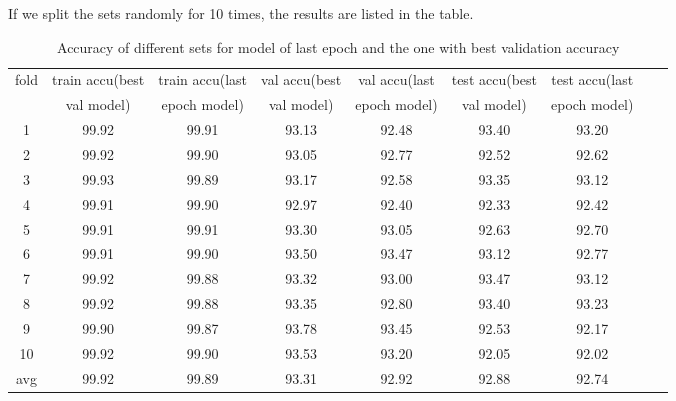If we split the sets randomly for 10 times, the results are listed in the table.
\begin{table}[!htbp]
	\centering
	\caption{Accuracy of different sets for model of last epoch and the one with best validation accuracy }
	\label{table:cv1}
	\begin{tabular}{|c|c|c|c|c|c|c|c|c|}
		\hline
%		
fold	&	train accu(best	&	train accu(last	&	val accu(best	&	val accu(last	&	test accu(best 	&	test accu(last	\\
	&	 val model)	&	 epoch model)	&	val model)	&	 epoch model)	&	val model)	&	 epoch model)	\\\hline
1	&	99.92	&	99.91	&	93.13	&	92.48	&	93.40	&	93.20	\\\hline
2	&	99.92	&	99.90	&	93.05	&	92.77	&	92.52	&	92.62	\\\hline
3	&	99.93	&	99.89	&	93.17	&	92.58	&	93.35	&	93.12	\\\hline
4	&	99.91	&	99.90	&	92.97	&	92.40	&	92.33	&	92.42	\\\hline
5	&	99.91	&	99.91	&	93.30	&	93.05	&	92.63	&	92.70	\\\hline
6	&	99.91	&	99.90	&	93.50	&	93.47	&	93.12	&	92.77	\\\hline
7	&	99.92	&	99.88	&	93.32	&	93.00	&	93.47	&	93.12	\\\hline
8	&	99.92	&	99.88	&	93.35	&	92.80	&	93.40	&	93.23	\\\hline
9	&	99.90	&	99.87	&	93.78	&	93.45	&	92.53	&	92.17	\\\hline
10	&	99.92	&	99.90	&	93.53	&	93.20	&	92.05	&	92.02	\\\hline
avg	&	99.92	&	99.89	&	93.31	&	92.92	&	92.88	&	92.74	\\\hline
	\end{tabular}
\end{table}


